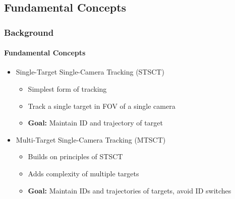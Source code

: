 \subsection{Fundamental Concepts}
\begin{frame}
    \frametitle{Background}
    \framesubtitle{Fundamental Concepts}

    \begin{itemize}
        \item <1->Single-Target Single-Camera Tracking (STSCT)
              \begin{itemize}
                  \item Simplest form of tracking
                  \item Track a single target in FOV of a single camera
                  \item \textbf{Goal:} Maintain ID and trajectory of target
              \end{itemize}
              \vspace{5pt}
        \item <2->Multi-Target Single-Camera Tracking (MTSCT)
              \begin{itemize}
                  \item Builds on principles of STSCT
                  \item Adds complexity of multiple targets
                  \item \textbf{Goal:} Maintain IDs and trajectories of targets, avoid ID switches
              \end{itemize}
    \end{itemize}
\end{frame}

